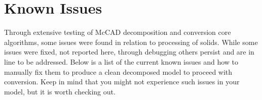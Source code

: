 \documentclass[12pt, a4paper, titlepage]{article}
\begin{document}
\section{Known Issues} \label{sec:Known Issues}
Through extensive testing of McCAD decomposition and conversion core algorithms, some issues were found in relation to processing of solids. While some issues were fixed, not reported here, through debugging others persist and are in line to be addressed. Below is a list of the current known issues and how to manually fix them to produce a clean decomposed model to proceed with conversion. Keep in mind that you might not experience such issues in your model, but it is worth checking out.
\end{document}

